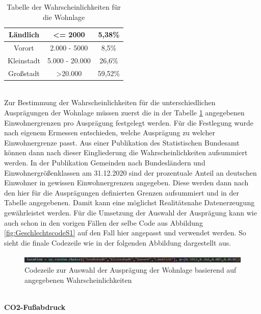 \begin{onehalfspace}
\begin{table}[!h]
\begin{tabular}{|c|c|c|}
    Ländlich              & \textless{}= 2000        & 5,38\%                      \\ \hline
    Vorort                & 2.000 - 5000             & 8,5\%                       \\ \hline
    Kleinstadt            & 5.000 - 20.000           & 26,6\%                      \\ \hline
    Großstadt             & \textgreater 20.000      & 59,52\%                     \\ \hline
    \end{tabular}
    \caption{Tabelle der Wahrscheinlichkeiten für die Wohnlage}
    \label{table:10}
\end{table}\\
Zur Bestimmung der Wahrscheinlichkeiten für die unterschiedlichen Ausprägungen der Wohnlage müssen zuerst die in der Tabelle \ref{table:10} angegebenen Einwohnergrenzen pro Ausprägung festgelegt werden. Für die Festlegung wurde nach eigenem Ermessen entschieden, welche Ausprägung zu welcher Einwohnergrenze passt. Aus einer Publikation des Statistischen Bundesamt können dann nach dieser Eingliederung die Wahrscheinlichkeiten aufsummiert werden. In der Publikation \glqq{}Gemeinden nach Bundesländern und Einwohnergrößenklassen am 31.12.2020\grqq{} sind der prozentuale Anteil an deutschen Einwohner in gewissen Einwohnergrenzen angegeben. Diese werden dann nach den hier für die Ausprägungen definierten Grenzen aufsummiert und in der Tabelle angegebenen. Damit kann eine möglichst Realitätsnahe Datenerzeugung gewährleistet werden. Für die Umsetzung der Auswahl der Ausprägung kann wie auch schon in den vorigen Fällen der selbe Code aus Abbildung \ref{fig:GeschlechtscodeS1} auf den Fall hier angepasst und verwendet werden. So sieht die finale Codezeile wie in der folgenden Abbildung dargestellt aus.
\begin{figure}[h]
    \centering
    \includegraphics[width=16cm]{Diagramme/Sz2_Auswahl_Lage.JPG}
    \caption{Codezeile zur Auswahl der Ausprägung der Wohnlage basierend auf angegebenen Wahrscheinlichkeiten}
    \label{fig:Sz2AuswahlWohnlage}
\end{figure}\\
\textbf{CO2-Fußabdruck}\\

\end{onehalfspace}
